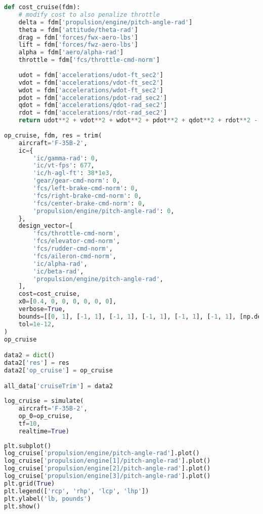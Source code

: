 \begin{lstlisting}[language=Python]
def cost_cruise(fdm):
    # modify cost to also penalize throttle
    delta = fdm['propulsion/engine/pitch-angle-rad']
    theta = fdm['attitude/theta-rad']
    drag = fdm['forces/fwx-aero-lbs']
    lift = fdm['forces/fwz-aero-lbs']
    alpha = fdm['aero/alpha-rad']
    throttle = fdm['fcs/throttle-cmd-norm']
    
    udot = fdm['accelerations/udot-ft_sec2']
    vdot = fdm['accelerations/vdot-ft_sec2']
    wdot = fdm['accelerations/wdot-ft_sec2']
    pdot = fdm['accelerations/pdot-rad_sec2']
    qdot = fdm['accelerations/qdot-rad_sec2']
    rdot = fdm['accelerations/rdot-rad_sec2']
    return udot**2 + vdot**2 + wdot**2 + pdot**2 + qdot**2 + rdot**2 - 1e-3*(lift/drag)**2 + 1e-3*(theta < 0) + 1e-1*throttle + 2e-1*delta**2 
        
op_cruise, fdm, res = trim(
    aircraft='F-35B-2',
    ic={
        'ic/gamma-rad': 0,
        'ic/vt-fps': 677,
        'ic/h-agl-ft': 38*1e3,
        'gear/gear-cmd-norm': 0,
        'fcs/left-brake-cmd-norm': 0,
        'fcs/right-brake-cmd-norm': 0,
        'fcs/center-brake-cmd-norm': 0,
        'propulsion/engine/pitch-angle-rad': 0,
    },
    design_vector=[
        'fcs/throttle-cmd-norm',
        'fcs/elevator-cmd-norm',
        'fcs/rudder-cmd-norm',
        'fcs/aileron-cmd-norm',
        'ic/alpha-rad',
        'ic/beta-rad',
        'propulsion/engine/pitch-angle-rad',
    ],
    cost=cost_cruise,
    x0=[0.4, 0, 0, 0, 0, 0, 0],
    verbose=True,
    bounds=[[0, 1], [-1, 1], [-1, 1], [-1, 1], [-1, 1], [-1, 1], [np.deg2rad(0), np.deg2rad(120)]],
    tol=1e-12,
)
op_cruise

data2 = dict()
data2['res'] = res
data2['op_cruise'] = op_cruise

all_data['cruiseTrim'] = data2
\end{lstlisting}

\begin{lstlisting}[language=Python]
log_cruise = simulate(
    aircraft='F-35B-2',
    op_0=op_cruise,
    tf=10,
    realtime=True)
\end{lstlisting}

\begin{lstlisting}[language=Python]
plt.subplot()
log_cruise['propulsion/engine/pitch-angle-rad'].plot()
log_cruise['propulsion/engine[1]/pitch-angle-rad'].plot()
log_cruise['propulsion/engine[2]/pitch-angle-rad'].plot()
log_cruise['propulsion/engine[3]/pitch-angle-rad'].plot()
plt.grid(True)
plt.legend(['rcp', 'rhp', 'lcp', 'lhp'])
plt.ylabel('lb, pounds')
plt.show()
\end{lstlisting}

